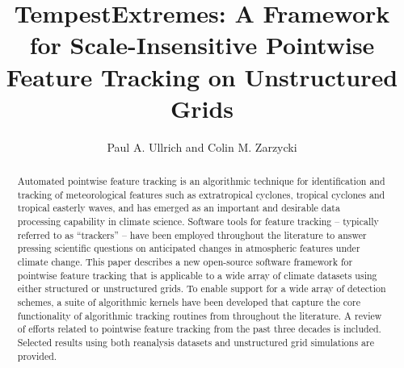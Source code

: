 \documentclass[gmdd, hvmath, online]{copernicus_discussions}
\begin{document}
\linenumbers

\title{TempestExtremes:  A Framework for Scale-Insensitive Pointwise Feature Tracking on Unstructured Grids}

\author{Paul A. Ullrich and Colin M. Zarzycki}







\received{}
\pubdiscuss{} %
\revised{}
\accepted{}
\published{}




\maketitle  %



\begin{abstract}
Automated pointwise feature tracking is an algorithmic technique for identification and tracking of meteorological features such as extratropical cyclones, tropical cyclones and tropical easterly waves, and has emerged as an important and desirable data processing capability in climate science.  Software tools for feature tracking -- typically referred to as ``trackers'' -- have been employed throughout the literature to answer pressing scientific questions on anticipated changes in atmospheric features under climate change.  This paper describes a new open-source software framework for pointwise feature tracking that is applicable to a wide array of climate datasets using either structured or unstructured grids.  To enable support for a wide array of detection schemes, a suite of algorithmic kernels have been developed that capture the core functionality of algorithmic tracking routines from throughout the literature.  A review of efforts related to pointwise feature tracking from the past three decades is included.  Selected results using both reanalysis datasets and unstructured grid simulations are provided.
\end{abstract}
\end{document}
